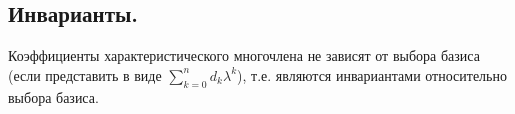 \subsection{
    Инварианты.
}

Коэффициенты характеристического многочлена не зависят от выбора базиса (если представить в виде $\sum_{k=0}^{n} d_k \lambda^k
$), т.е. являются инвариантами относительно выбора базиса.

\begin{comment}
    Наиболее просто выражается коэффициент $d_{n - 1} = \tr \mathscr{A}$.
\end{comment}

\begin{comment}
    Коэффициент $d_0$ характеристического многочлена совпадает со значением этого многочлена при $\lambda = 0$ и равен определителю линейного оператора $\mathscr{A}$.
\end{comment}
